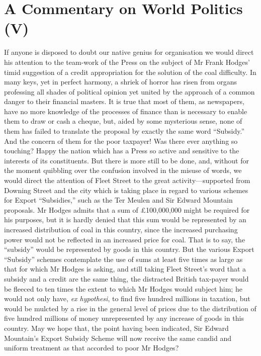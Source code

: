 \documentclass{book}
\begin{document}
\chapter{A Commentary on World Politics (V)}
\label{chapter-13}
If anyone is disposed to doubt our native genius for organisation we would direct his attention to the team-work of the Press on the subject of Mr Frank Hodges’ timid suggestion of a credit appropriation for the solution of the coal difficulty. In many keys, yet in perfect harmony, a shriek of horror has risen from organs professing all shades of political opinion yet united by the approach of a common danger to their financial masters. It is true that most of them, as newspapers, have no more knowledge of the processes of finance than is necessary to enable them to draw or cash a cheque, but, aided by some mysterious sense, none of them has failed to translate the proposal by exactly the same word “Subsidy.” And the concern of them for the poor taxpayer! Was there ever anything so touching? Happy the nation which has a Press so active and sensitive to the interests of its constituents. But there is more still to be done, and, without for the moment quibbling over the confusion involved in the misuse of words, we would direct the attention of Fleet Street to the great activity—supported from Downing Street and the city which is taking place in regard to various schemes for Export “Subsidies,” such as the Ter Meulen and Sir Edward Mountain proposals. Mr Hodges admits that a sum of £100,000,000 might be required for his purposes, but it is hardly denied that this sum would be represented by an increased distribution of coal in this country, since the increased purchasing power would not be reflected in an increased price for coal. That is to say, the “subsidy” would be represented by goods in this country. But the various Export “Subsidy” schemes contemplate the use of sums at least five times as large as that for which Mr Hodges is asking, and still taking Fleet Street’s word that a subsidy and a credit are the same thing, the distracted British tax-payer would be fleeced to ten times the extent to which Mr Hodges would subject him; he would not only have, \emph{ex hypothesi}, to find five hundred millions in taxation, but would be mulcted by a rise in the general level of prices due to the distribution of five hundred millions of money unrepresented by any increase of goods in this country. May we hope that, the point having been indicated, Sir Edward Mountain’s Export Subsidy Scheme will now receive the same candid and uniform treatment as that accorded to poor Mr Hodges?
\end{document}
